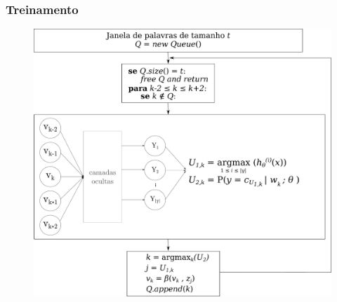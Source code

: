 \documentclass[10pt]{beamer}
\begin{document}
\begin{frame}[fragile]
\frametitle{Treinamento}
\vspace{-2.5em}


  \begin{figure}
      \begin{center}
        \includegraphics[scale=0.15]{img/neuralnetworkfinal_alg2.pdf}
      \end{center}
    \end{figure}

\end{frame}
\end{document}
